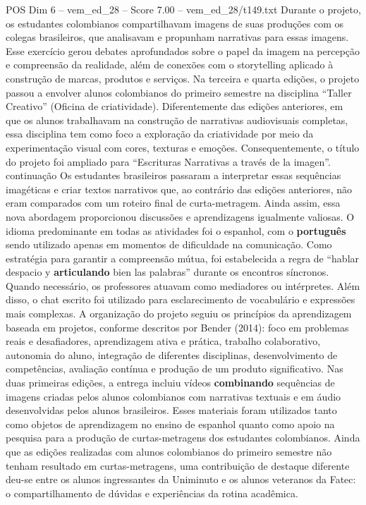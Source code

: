 \begin{textsample}{POS Dim 6 – vem\_ed\_28 – Score 7.00 – vem\_ed\_28/t149.txt}
Durante o projeto, os estudantes colombianos compartilhavam imagens de suas produções com os colegas brasileiros, que analisavam e propunham narrativas para essas imagens.
Esse exercício gerou debates aprofundados sobre o papel da imagem na percepção e compreensão da realidade, além de conexões com o storytelling aplicado à construção de marcas, produtos e serviços.
Na terceira e quarta edições, o projeto passou a envolver alunos colombianos do primeiro semestre na disciplina “Taller Creativo” (Oficina de criatividade).
Diferentemente das edições anteriores, em que os alunos trabalhavam na construção de narrativas audiovisuais completas, essa disciplina tem como foco a exploração da criatividade por meio da experimentação visual com cores, texturas e emoções.
Consequentemente, o título do projeto foi ampliado para “Escrituras Narrativas a través de la imagen”. continuação Os estudantes brasileiros passaram a interpretar essas sequências imagéticas e criar textos narrativos que, ao contrário das edições anteriores, não eram comparados com um roteiro final de curta-metragem.
Ainda assim, essa nova abordagem proporcionou discussões e aprendizagens igualmente valiosas.
O idioma predominante em todas as atividades foi o espanhol, com o \textbf{português} sendo utilizado apenas em momentos de dificuldade na comunicação.
Como estratégia para garantir a compreensão mútua, foi estabelecida a regra de “hablar despacio y \textbf{articulando} bien las palabras” durante os encontros síncronos.
Quando necessário, os professores atuavam como mediadores ou intérpretes.
Além disso, o chat escrito foi utilizado para esclarecimento de vocabulário e expressões mais complexas.
A organização do projeto seguiu os princípios da aprendizagem baseada em projetos, conforme descritos por Bender (2014): foco em problemas reais e desafiadores, aprendizagem ativa e prática, trabalho colaborativo, autonomia do aluno, integração de diferentes disciplinas, desenvolvimento de competências, avaliação contínua e produção de um produto significativo.
Nas duas primeiras edições, a entrega incluiu vídeos \textbf{combinando} sequências de imagens criadas pelos alunos colombianos com narrativas textuais e em áudio desenvolvidas pelos alunos brasileiros.
Esses materiais foram utilizados tanto como objetos de aprendizagem no ensino de espanhol quanto como apoio na pesquisa para a produção de curtas-metragens dos estudantes colombianos.
Ainda que as edições realizadas com alunos colombianos do primeiro semestre não tenham resultado em curtas-metragens, uma contribuição de destaque diferente deu-se entre os alunos ingressantes da Uniminuto e os alunos veteranos da Fatec: o compartilhamento de dúvidas e experiências da rotina acadêmica.

\end{textsample}
